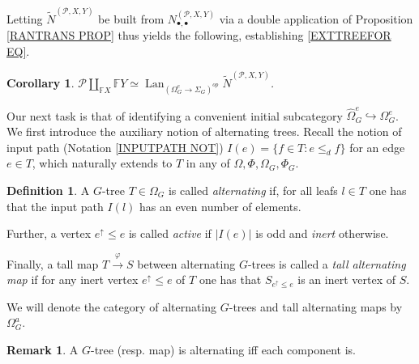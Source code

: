 \documentclass[a4paper,10pt
,draft
]{article}%
\numberwithin{equation}{section}
\numberwithin{figure}{section}
\newtheorem{corollary}[equation]{Corollary}%
\theoremstyle{definition} %
\newtheorem{definition}[equation]{Definition}%
\newtheorem{remark}[equation]{Remark}%
\DeclareMathOperator{\Lan}{Lan}%
\newcommand{\1}{\ensuremath{\mathbbm 1}}%
\begin{document}
Letting 
$\tilde{N}^{(\mathcal P, X,Y)}$
be built from
$N_{\bullet,\bullet}^{(\mathcal P, X,Y)}$
via a double application of Proposition \ref{RANTRANS PROP}  thus yields the following, establishing 
\eqref{EXTTREEFOR EQ}.

\begin{corollary}
	$\mathcal P \coprod\limits_{\mathbb F X} \mathbb F Y \simeq \Lan_{(\Omega_G^e \to \Sigma_G)^{op}}\tilde N^{(\mathcal P, X,Y)}$.
\end{corollary}

Our next task is that of identifying a convenient initial subcategory $\widehat{\Omega}_G^{e} \hookrightarrow \Omega_G^e$.
We first introduce the auxiliary notion of alternating trees.
Recall the notion of input path (Notation \ref{INPUTPATH NOT})
$I(e) = \{f \in T \colon e \leq_d f\}$ for an edge $e \in T$, which naturally extends to $T$ in any of $\Omega, \Phi, \Omega_G, \Phi_G$.


\begin{definition}\label{OMEGAA DEF}
A $G$-tree $T \in \Omega_G$ is called \textit{alternating} if, for all leafs $l \in T$ one has that the input path $I(l)$ has an even number of elements.

Further, a vertex $e^{\uparrow} \leq e$ is called \textit{active}
if $|I(e)|$ is odd and \textit{inert} otherwise.

Finally, a tall map $T \xrightarrow{\varphi} S$ between alternating $G$-trees is called a 
\textit{tall alternating map}
if for any inert vertex $e^{\uparrow} \leq e$ of $T$ one has that 
$S_{e^{\uparrow} \leq e}$ is an inert vertex of $S$.

We will denote the category of alternating $G$-trees and tall alternating maps by $\Omega_G^a$.
\end{definition}

\begin{remark}
	A $G$-tree (resp. map) is alternating
	iff each component is.
\end{remark}
\end{document}
